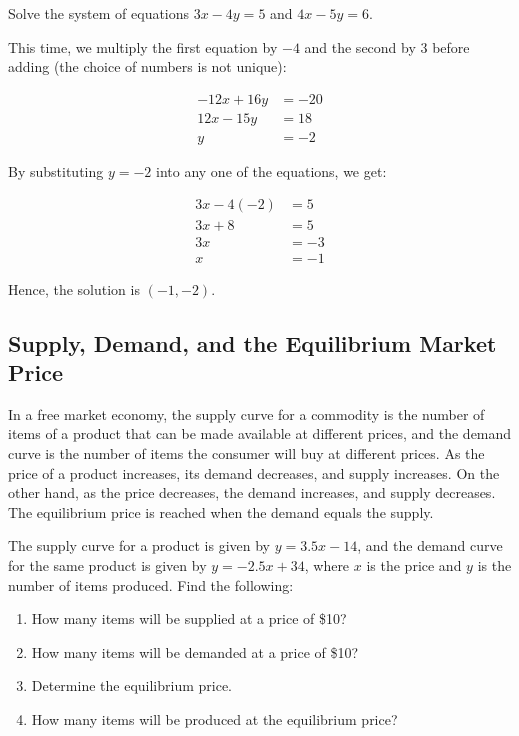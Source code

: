 \begin{example}
Solve the system of equations $3x - 4y = 5$ and $4x - 5y = 6$.
\end{example}

\begin{solution}
This time, we multiply the first equation by $-4$ and the second by $3$ before adding (the choice of numbers is not unique):

\begin{align*}
-12x + 16y &= -20 \\
12x - 15y &= 18 \\
y &= -2
\end{align*}

By substituting $y = -2$ into any one of the equations, we get:

\begin{align*}
3x - 4(-2) &= 5 \\
3x + 8 &= 5 \\
3x &= -3 \\
x &= -1
\end{align*}

Hence, the solution is $(-1, -2)$.
\end{solution}

\subsection{Supply, Demand, and the Equilibrium Market Price}

In a free market economy, the supply curve for a commodity is the number of items of a product that can be made available at different prices, and the demand curve is the number of items the consumer will buy at different prices. As the price of a product increases, its demand decreases, and supply increases. On the other hand, as the price decreases, the demand increases, and supply decreases. The equilibrium price is reached when the demand equals the supply.

\begin{example}
The supply curve for a product is given by $y = 3.5x - 14$, and the demand curve for the same product is given by $y = -2.5x + 34$, where $x$ is the price and $y$ is the number of items produced. Find the following:
\begin{enumerate}
  \item How many items will be supplied at a price of \$10?
  \item How many items will be demanded at a price of \$10?
  \item Determine the equilibrium price.
  \item How many items will be produced at the equilibrium price?
\end{enumerate}
\end{example}

